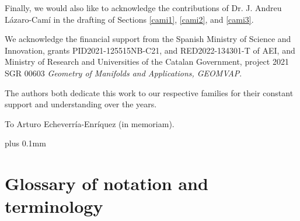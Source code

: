 \documentclass[12pt]{report}
\begin{document}
Finally, we would also like to acknowledge the contributions of Dr. J. Andreu L\'azaro-Cam\'i in the drafting of Sections \ref{cami1}, \ref{cami2}, and \ref{cami3}.

We acknowledge the financial support from the 
Spanish Ministry of Science and Innovation, grants  PID2021-125515NB-C21, and RED2022-134301-T of AEI, 
and Ministry of Research and Universities of
the Catalan Government, project 2021 SGR 00603 \textsl{Geometry of Manifolds and Applications, GEOMVAP}.




\newpage

\vspace{7cm}

\noindent The authors both dedicate this work to our respective families for their constant support and understanding over the years.

\vspace{0,5cm}

\noindent  To Arturo Echeverr\'ia-Enr\'iquez (in memoriam).

{\setcounter{tocdepth}{2}
\def\baselinestretch{1}
\small
\def\addvspace#1{\vskip 1pt}
\parskip 0pt plus 0.1mm
\tableofcontents
}




\chapter*{Glossary of notation and terminology}
\end{document}
